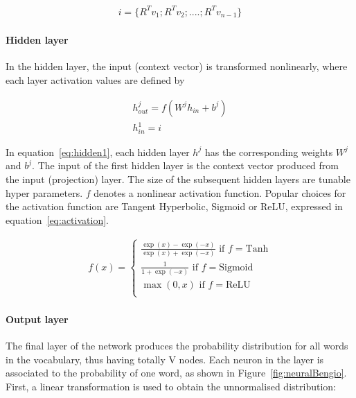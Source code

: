 \begin{equation}
\begin{aligned}
i = \{R^T v_1; R^T v_2; .... ; R^T v_{n-1} \}
\end{aligned}  
\end{equation}


\paragraph{Hidden layer}
In the hidden layer, the input (context vector) is transformed nonlinearly, where each layer activation values are defined by

\begin{equation}
\begin{aligned}
h^j_{out} = f(W^j h_{in} + b^j) \\
h^1_{in} = i
\label{eq:hidden1}
\end{aligned}  
\end{equation}

In equation~\ref{eq:hidden1}, each hidden layer $h^j$ has the corresponding weights $W^j$ and $b^j$. The input of the first hidden layer is the context vector produced from the input (projection) layer. The size of the subsequent hidden layers are tunable hyper parameters. $f$ denotes a nonlinear activation function. Popular choices for the activation function are Tangent Hyperbolic, Sigmoid or ReLU, expressed in equation~\ref{eq:activation}. 


\begin{equation}
\begin{aligned}
 f(x) = 
	\begin{cases}
	\frac{\exp (x) - \exp (-x)}{\exp (x) + \exp (-x)}    \text{    if } f = \text{Tanh} \\
	\frac{1}{1 + \exp(-x)}                \text{     if } f = \text{Sigmoid} \\
	\max(0, x) \text{     if } f = \text{ReLU} \\
	\end{cases}
\label{eq:activation}
\end{aligned}
\end{equation}

\paragraph{Output layer}
The final layer of the network produces the probability distribution for all words in the vocabulary, thus having totally V nodes. Each neuron in the layer is associated to the probability of one word, as shown in Figure~\ref{fig:neuralBengio}. First, a linear transformation is used to obtain the unnormalised distribution:

